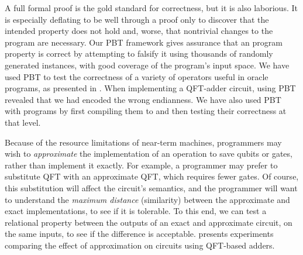 A full formal proof is the gold standard for correctness, but it is also
laborious. It is especially deflating to be well through a proof only
to discover that the intended property does not hold and, worse,
that nontrivial changes to the program are necessary.
Our PBT framework gives assurance that an \oqasm
program property is correct by attempting to falsify it using
thousands of randomly generated instances, with good coverage of the
program's input space. We have used PBT to test the correctness of a
variety of operators useful in oracle programs, as presented in
. When implementing a QFT-adder circuit, using
PBT revealed that we had encoded the wrong endianness. 
We have also used PBT with \vqimp programs by first
compiling them to \oqasm and then testing their correctness at that
level.


Because of the resource limitations of near-term machines, programmers
may wish to \emph{approximate} the implementation of an operation to
save qubits or gates, rather than implement it exactly. For example, a
programmer may prefer to substitute QFT with an approximate QFT, which
requires fewer gates. Of course, this substitution will affect the
circuit's semantics, and the programmer will want to understand the
\emph{maximum distance} (similarity) between the approximate and exact
implementations, to see if it is tolerable. To this end, we can test
a relational property between the outputs of an exact and approximate circuit, 
on the same inputs, to see if the difference is
acceptable.  presents experiments comparing
the effect of approximation on circuits using QFT-based adders.


